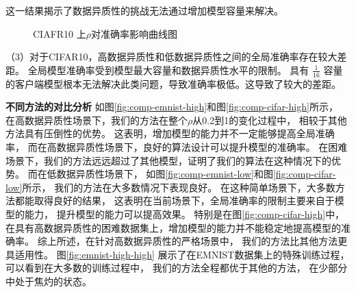 这一结果揭示了数据异质性的挑战无法通过增加模型容量来解决。
\begin{figure}[thbp]
    \centering
    \hfill
    \hfill
    \caption{ CIAFR10 上$\rho$对准确率影响曲线图}
    \label{fig:motivation_distribution_cifar}
\end{figure}
（3）对于CIFAR10，高数据异质性和低数据异质性之间的全局准确率存在较大差距。
全局模型准确率受到模型最大容量和数据异质性水平的限制。
具有
$\frac{1}{16}$
容量的客户端模型根本无法解决此类问题，导致准确率极低。这导致了较大的差距。

\textbf{不同方法的对比分析 }
如图\ref{fig:comp-emnist-high}和图\ref{fig:comp-cifar-high}所示，
在高数据异质性场景下，我们的方法在整个$\rho$从0.2到1的变化过程中，
相较于其他方法具有压倒性的优势。
这表明，增加模型的能力并不一定能够提高全局准确率，
而在高数据异质性场景下，良好的算法设计可以提升模型的准确率。
在困难场景下，我们的方法远远超过了其他模型，证明了我们的算法在这种情况下的优势。
而在低数据异质性场景下，
如图\ref{fig:comp-emnist-low}和图\ref{fig:comp-cifar-low}所示，
我们的方法在大多数情况下表现良好。
在这种简单场景下，大多数方法都能取得良好的结果，
这表明在当前场景下，全局准确率的限制主要来自于模型的能力，
提升模型的能力可以提高效果。
特别是在图\ref{fig:comp-cifar-high}中，
在具有高数据异质性的困难数据集上，增加模型的能力并不能稳定地提高模型的准确率。
综上所述，在针对高数据异质性的严格场景中，
我们的方法比其他方法更具适用性。
图\ref{fig:emnist-high-high}
展示了在EMNIST数据集上的特殊训练过程，
可以看到在大多数的训练过程中，
我们的方法全程都优于其他的方法，
在少部分中处于焦灼的状态。

